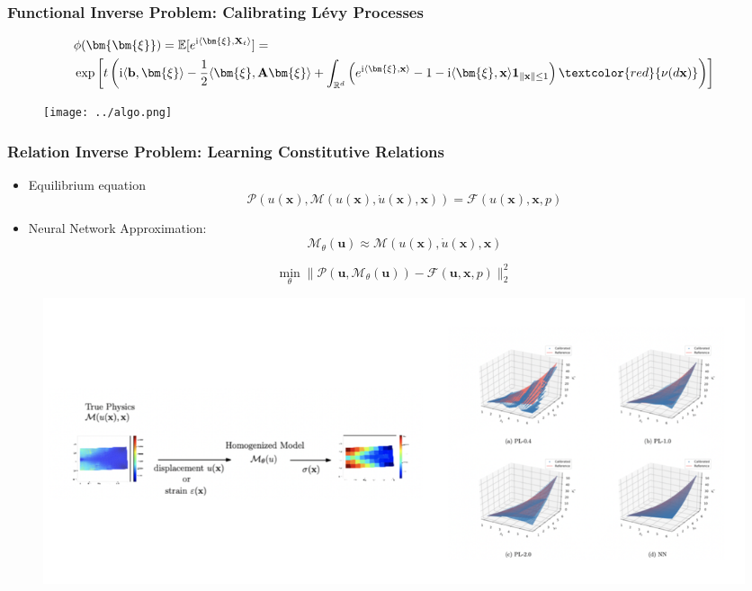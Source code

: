 \documentclass{beamer}
\newcommand{\bx}{\mathbf{x}}
\newcommand{\ii}{\mathrm{i}}
\newcommand{\bxi}{\bm{\xi}}
\newcommand{\bb}{\mathbf{b}}
\newcommand{\bA}{\mathbf{A}}
\newcommand{\bX}{\mathbf{X}}
\newcommand{\red}[1]{\textcolor{red}{#1}}
\newcommand{\RR}[0]{\mathbb{R}}
\begin{document}
\begin{frame}
	\frametitle{Functional Inverse Problem: Calibrating L\'evy Processes}
	{\small
	\begin{align*}
		 		& \phi(\bm{\bxi}) = \mathbb{E}[e^{\ii \langle \bxi, \bX_t \rangle}]= \\
		 		& \exp\left[t\left( \ii \langle \bb, \bxi \rangle - \frac{1}{2}\langle \bxi, \bA\bxi\rangle  +\int_{\RR^d} \left( e^{\ii \langle \bxi, \bx\rangle} - 1 - \ii \langle \bxi, \bx\rangle \mathbf{1}_{\|\bx\|\leq 1}\right)\red{\nu(d\bx)}\right) \right]
		 	\end{align*}
		 	}
	\begin{figure}[hbt]
	 \texttt{[image: ../algo.png]}
\end{figure}
\end{frame}

\begin{frame}
	\frametitle{Relation Inverse Problem: Learning Constitutive Relations}
	\begin{itemize}
		\item Equilibrium equation
		\begin{equation*}
		\mathcal{P}(u(\mathbf{x}), \mathcal{M}(u(\mathbf{x}),\dot u(\mathbf{x}), \mathbf{x})) = \mathcal{F}(u(\mathbf{x}), \mathbf{x}, p)
	\end{equation*}
		\item Neural Network Approximation:
		\begin{equation*}
			\mathcal{M}_{\theta}(\mathbf{u}) \approx \mathcal{M}(u(\mathbf{x}),\dot u(\mathbf{x}),\mathbf{x})
		\end{equation*}
	\end{itemize}
	
	
	\begin{equation*}
		\boxed{\min_{\theta}\|\mathcal{P}(\mathbf{u}, \mathcal{M}_{\theta}(\mathbf{u})) - \mathcal{F}(\mathbf{u}, \mathbf{x}, p) \|^2_2}
	\end{equation*}
		\begin{figure}[hbt]
	 \includegraphics[width=1.0\textwidth]{../law.png}
\end{figure}
\end{frame}
\end{document}
